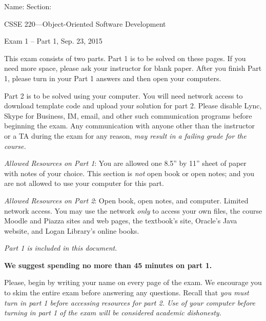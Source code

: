 \documentclass[12pt,twoside]{article}
\newcommand{\fillInBlank}[1][0.5in]{\underline{\hspace{#1}}}
\begin{document}

\begin{flushright}
Name: \fillInBlank[3in] Section: \fillInBlank[1in]

\LARGE{CSSE 220---Object-Oriented Software Development}

\Large{Exam 1 -- Part 1, Sep. 23, 2015}
\end{flushright}

This exam consists of two parts.  Part 1 is to be solved on these pages. If you need more space, please ask your instructor for blank paper.  After you finish Part 1, please turn in your Part 1 answers and then open your computers.

Part 2 is to be solved using your computer.  You will need network access to download template code and upload your solution for part 2.  Please disable Lync, Skype for Business, IM, email, and other such communication programs before beginning the exam.  Any communication with anyone other than the instructor or a TA during the exam for any reason, \emph{may result in a failing grade for the course.}

\emph{Allowed Resources on Part 1}:  You are allowed one 8.5'' by 11'' sheet of paper with notes of your choice.  This section is \emph{not} open book or open notes; and you are not allowed to use your computer for this part.  

\emph{Allowed Resources on Part 2}:  Open book, open notes, and computer.  Limited network access.  You may use the network \emph{only} to access your own files, the course Moodle and Piazza sites and web pages, the textbook's site, Oracle's Java website, and Logan Library's online books. 

\emph{Part 1 is included in this document}.  

\begin{center}
\textbf{We suggest spending no more than 45 minutes on part 1.}
\end{center}

Please, begin by writing your name on every page of the exam. We encourage you to skim the
entire exam before answering any questions. Recall that \emph{you must turn in part 1 before accessing resources for part 2. Use of your computer before turning
in part 1 of the exam will be considered academic dishonesty.}


\vfill
\end{document}
